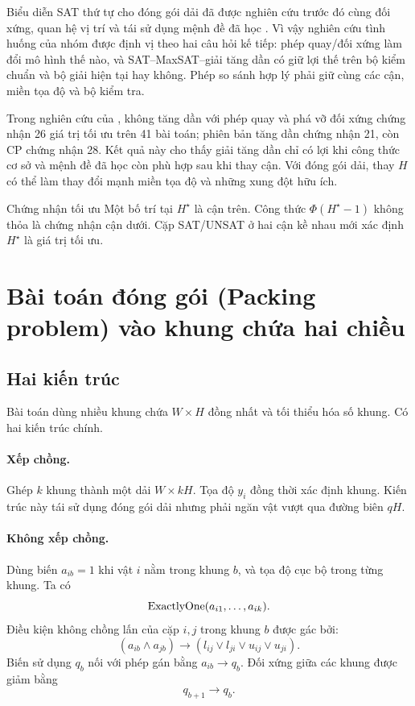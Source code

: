Biểu diễn SAT thứ tự cho đóng gói dải đã được nghiên cứu trước đó cùng đối xứng,
quan hệ vị trí và tái sử dụng mệnh đề đã học
\parencite{soh2010strip}. Vì vậy nghiên cứu tình huống của nhóm được định vị
theo hai câu hỏi kế tiếp: phép quay/đối xứng làm đổi mô hình thế nào, và
SAT--MaxSAT--giải tăng dần có giữ lợi thế trên bộ kiểm chuẩn và bộ giải hiện
tại hay không. Phép so sánh hợp lý phải giữ cùng các cận, miền tọa độ và bộ
kiểm tra.

Trong nghiên cứu của \textcite{kieu2025strip}, \SAT không tăng dần với phép
quay và phá vỡ đối xứng chứng nhận 26 giá trị tối ưu trên 41 bài toán; phiên bản
tăng dần chứng nhận 21, còn CP chứng nhận 28. Kết quả này cho thấy giải tăng
dần chỉ có lợi khi công thức cơ sở và mệnh đề đã học còn phù hợp sau khi thay
cận. Với đóng gói dải, thay \(H\) có thể làm thay đổi mạnh miền tọa độ và
những xung đột hữu ích.

\begin{keyidea}{Chứng nhận tối ưu}
Một bố trí tại \(H^\star\) là cận trên. Công thức \(\Phi(H^\star-1)\) không
thỏa là chứng nhận cận dưới. Cặp SAT/UNSAT ở hai cận kề nhau mới xác định
\(H^\star\) là giá trị tối ưu.
\end{keyidea}

\section{Bài toán đóng gói (Packing problem) vào khung chứa hai chiều}

\subsection{Hai kiến trúc}

Bài toán dùng nhiều khung chứa \(W\times H\) đồng nhất và tối thiểu hóa số
khung. Có hai kiến trúc chính.

\paragraph{Xếp chồng.}
Ghép \(k\) khung thành một dải \(W\times kH\). Tọa độ \(y_i\) đồng thời xác
định khung. Kiến trúc này tái sử dụng đóng gói dải nhưng phải ngăn vật vượt qua
đường biên \(qH\).

\paragraph{Không xếp chồng.}
Dùng biến \(a_{ib}=1\) khi vật \(i\) nằm trong khung \(b\), và tọa độ cục bộ
trong từng khung. Ta có
\[
  \operatorname{ExactlyOne}(a_{i1},\ldots,a_{ik}).
\]
Điều kiện không chồng lấn của cặp \(i,j\) trong khung \(b\) được gác bởi:
\[
  (a_{ib}\land a_{jb})
  \rightarrow
  (l_{ij}\lor l_{ji}\lor u_{ij}\lor u_{ji}).
\]
Biến sử dụng \(q_b\) nối với phép gán bằng \(a_{ib}\rightarrow q_b\).
Đối xứng giữa các khung được giảm bằng
\[
  q_{b+1}\rightarrow q_b.
\]

